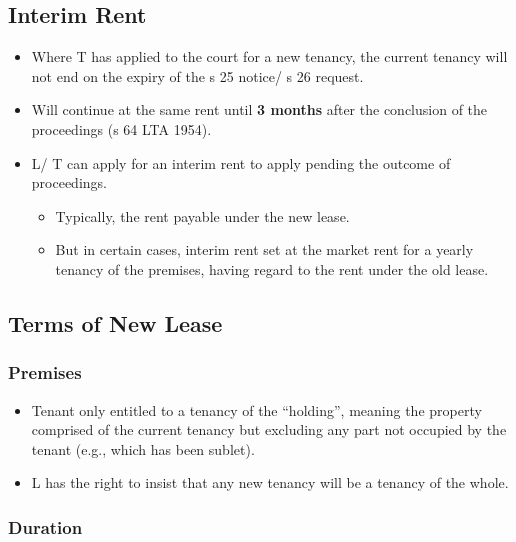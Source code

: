 \documentclass[
]{article}
\providecommand{\tightlist}{%
  \setlength{\itemsep}{0pt}\setlength{\parskip}{0pt}}
\begin{document}
\hypertarget{interim-rent}{%
\subsection{Interim Rent}\label{interim-rent}}

\begin{itemize}
\tightlist
\item
  Where T has applied to the court for a new tenancy, the current
  tenancy will not end on the expiry of the s 25 notice/ s 26 request.
\item
  Will continue at the same rent until \textbf{3 months} after the
  conclusion of the proceedings (s 64 LTA 1954).
\item
  L/ T can apply for an interim rent to apply pending the outcome of
  proceedings.

  \begin{itemize}
  \tightlist
  \item
    Typically, the rent payable under the new lease.
  \item
    But in certain cases, interim rent set at the market rent for a
    yearly tenancy of the premises, having regard to the rent under the
    old lease.
  \end{itemize}
\end{itemize}

\hypertarget{terms-of-new-lease}{%
\subsection{Terms of New Lease}\label{terms-of-new-lease}}

\hypertarget{premises}{%
\subsubsection{Premises}\label{premises}}

\begin{itemize}
\tightlist
\item
  Tenant only entitled to a tenancy of the ``holding'', meaning the
  property comprised of the current tenancy but excluding any part not
  occupied by the tenant (e.g., which has been sublet).
\item
  L has the right to insist that any new tenancy will be a tenancy of
  the whole.
\end{itemize}

\hypertarget{duration}{%
\subsubsection{Duration}\label{duration}}
\end{document}
